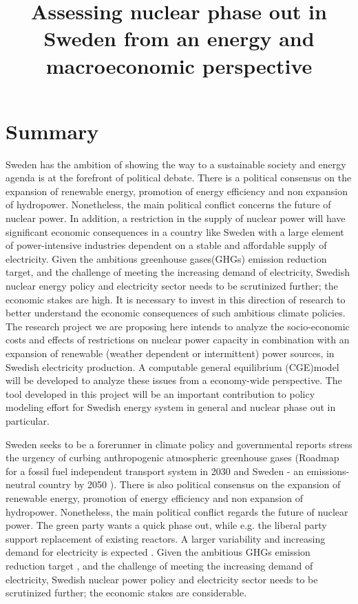 


\title{Assessing nuclear phase out in Sweden from an energy and macroeconomic perspective}
\maketitle
\author{}
\date{}
\section{Summary}
Sweden has the ambition of showing the way to a sustainable society and energy agenda is at the forefront of political debate. There is a political consensus on the expansion of renewable energy, promotion of energy efficiency and non expansion of hydropower. Nonetheless, the main political conflict concerns the future of nuclear power. In addition, a restriction in the supply of nuclear power will have significant economic consequences in a country like Sweden with a large element of power-intensive industries dependent on a stable and affordable supply of electricity. Given the ambitious greenhouse gases(GHGs) emission reduction target, and the challenge of meeting the increasing demand of electricity, Swedish nuclear energy policy and electricity sector needs to be scrutinized further; the economic stakes are high. It is necessary to invest in this direction of research to better understand the economic consequences of such ambitious climate policies. The research project we are proposing here intends to analyze the socio-economic costs and effects of restrictions on nuclear power capacity in combination with an expansion of renewable (weather dependent or intermittent) power sources, in Swedish electricity production. A computable general equilibrium (CGE)model will be developed to analyze these issues from a economy-wide perspective. The tool developed in this project will be an important contribution to policy modeling effort for Swedish energy system in general and nuclear phase out in particular.

Sweden seeks to be a forerunner in climate policy and governmental reports stress the urgency of curbing anthropogenic atmospheric greenhouse gases (Roadmap for a fossil fuel independent transport system in 2030 \cite{SOU201384} and Sweden - an emissions-neutral country by 2050 \cite{sepa2012}). There is also political consensus on the expansion of renewable energy, promotion of energy efficiency and non expansion of hydropower. Nonetheless, the main political conflict regards the future of nuclear power. The green party wants a quick phase out, while e.g. the liberal party support replacement of existing reactors. A larger variability and increasing demand for electricity is expected \cite{sepa2012, SOU201384}. Given the ambitious GHGs emission reduction target \cite{SOU201384}, and the challenge of meeting the increasing demand of electricity, Swedish nuclear power policy and electricity sector needs to be scrutinized further; the economic stakes are considerable.


